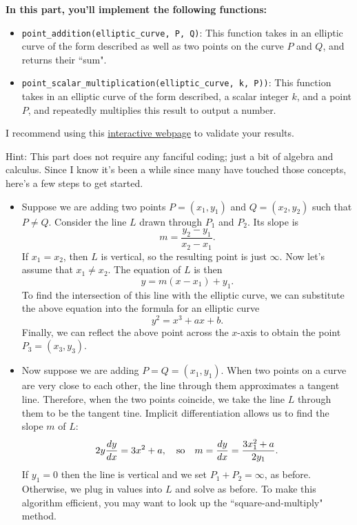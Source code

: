 \documentclass{article}
\begin{document}
\begin{tcolorbox}[enhanced,interior style={top color=Plum!20,bottom color=Plum!30}]
    \textbf{In this part, you'll implement the following functions:}
    \begin{itemize}
        \item \lstinline{point_addition(elliptic_curve, P, Q)}: This function takes in an elliptic curve of the form described as well as two points on the curve $P$ and $Q$, and returns their ``sum".
        \item \lstinline{point_scalar_multiplication(elliptic_curve, k, P))}: This function takes in an elliptic curve of the form described, a scalar integer $k$, and a point $P$, and repeatedly multiplies this result to output a number.
    \end{itemize}
    I recommend using this \href{https://andrea.corbellini.name/ecc/interactive/reals-add.html}{interactive webpage} to validate your results.

    \vspace{3mm}
    Hint: This part does not require any fanciful coding; just a bit of algebra and calculus. Since I know it's been a while since many have touched those concepts, here's a few steps to get started.
    \begin{itemize}
        \item Suppose we are adding two points $P = (x_{1}, y_{1})$ and $Q = (x_{2}, y_{2})$ such that $P \ne Q$. Consider the line $L$ drawn through $P_{1}$ and $P_{2}$. Its slope is $$m = \frac{y_{2} - y_{1}}{x_{2} - x_{1}}.$$ If $x_{1} = x_{2}$, then $L$ is vertical, so the resulting point is just $\infty$. Now let's assume that $x_{1} \ne x_{2}$. The equation of $L$ is then $$y = m(x - x_{1}) + y_{1}.$$ To find the intersection of this line with the elliptic curve, we can substitute the above equation into the formula for an elliptic curve $$y^{2} = x^{3} + ax + b.$$ Finally, we can reflect the above point across the $x$-axis to obtain the point $P_{3} = (x_{3}, y_{3})$.
        \item Now suppose we are adding $P = Q = (x_{1}, y_{1})$. When two points on a curve are very close to each other, the line through them approximates a tangent line. Therefore, when the two points coincide, we take the line $L$ through them to be the tangent tine. Implicit differentiation allows us to find the slope $m$ of $L$: $$2y \frac{dy}{dx} = 3x^{2} + a,\text{\quad so\quad} m = \frac{dy}{dx} = \frac{3x_{1}^{2} + a}{2y_{1}}.$$ If $y_{1} = 0$ then the line is vertical and we set $P_{1} + P_{2} = \infty$, as before. Otherwise, we plug in values into $L$ and solve as before. To make this algorithm efficient, you may want to look up the ``square-and-multiply" method.
    \end{itemize}
    
\end{tcolorbox}
\end{document}
